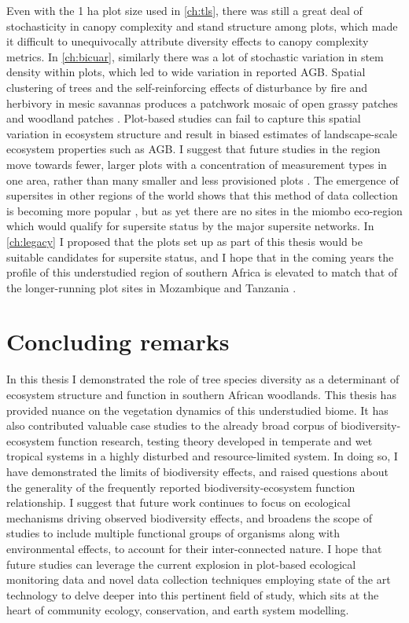 \begin{refsection}
Even with the 1 ha plot size used in \autoref{ch:tls}, there was still a great deal of stochasticity in canopy complexity and stand structure among plots, which made it difficult to unequivocally attribute diversity effects to canopy complexity metrics. In \autoref{ch:bicuar}, similarly there was a lot of stochastic variation in stem density within plots, which led to wide variation in reported AGB. Spatial clustering of trees and the self-reinforcing effects of disturbance by fire and herbivory in mesic savannas produces a patchwork mosaic of open grassy patches and woodland patches \citep{Staver2011, Schertzer2015}. Plot-based studies can fail to capture this spatial variation in ecosystem structure and result in biased estimates of landscape-scale ecosystem properties such as AGB. I suggest that future studies in the region move towards fewer, larger plots with a concentration of measurement types in one area, rather than many smaller and less provisioned plots \citep{Kreyling2018}. The emergence of supersites in other regions of the world shows that this method of data collection is becoming more popular \citep{Schepaschenko2019}, but as yet there are no sites in the miombo eco-region which would qualify for supersite status by the major supersite networks. In \autoref{ch:legacy} I proposed that the plots set up as part of this thesis would be suitable candidates for supersite status, and I hope that in the coming years the profile of this understudied region of southern Africa is elevated to match that of the longer-running plot sites in Mozambique \citep{Ryan2011} and Tanzania \citep{McNicol2018a}.

\section{Concluding remarks}
\label{discussion:sec:conclusion}

In this thesis I demonstrated the role of tree species diversity as a determinant of ecosystem structure and function in southern African woodlands. This thesis has provided nuance on the vegetation dynamics of this understudied biome. It has also contributed valuable case studies to the already broad corpus of biodiversity-ecosystem function research, testing theory developed in temperate and wet tropical systems in a highly disturbed and resource-limited system. In doing so, I have demonstrated the limits of biodiversity effects, and raised questions about the generality of the frequently reported biodiversity-ecosystem function relationship. I suggest that future work continues to focus on ecological mechanisms driving observed biodiversity effects, and broadens the scope of studies to include multiple functional groups of organisms along with environmental effects, to account for their inter-connected nature. I hope that future studies can leverage the current explosion in plot-based ecological monitoring data and novel data collection techniques employing state of the art technology to delve deeper into this pertinent field of study, which sits at the heart of community ecology, conservation, and earth system modelling.

\newpage{}
\begingroup
{}
\printbibliography[heading=subbibintoc]
\endgroup

\end{refsection}

